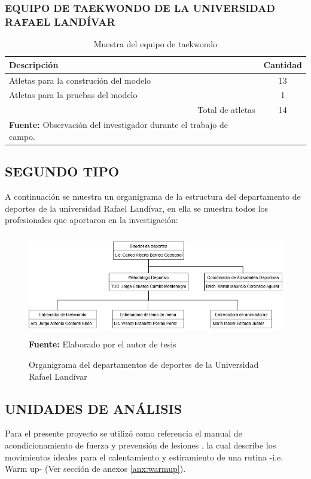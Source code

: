 \subsubsection{EQUIPO DE TAEKWONDO DE LA UNIVERSIDAD RAFAEL LAND\'IVAR}\label{sj:1t:tae}
\begin{table}[H]
\begin{center}
\caption{Muestra del equipo de taekwondo}
\label{tab:MuestraTaekwondo}
\begin{tabular}{lc}
\hline
\multicolumn{1}{|l|}{\textbf{Descripci\'on}} & \multicolumn{1}{l|}{\textbf{Cantidad}} \\ \hline
\multicolumn{1}{|l|}{Atletas para la construci\'on del modelo} & \multicolumn{1}{c|}{13} \\ \hline
\multicolumn{1}{|l|}{Atletas para la pruebas del modelo} & \multicolumn{1}{c|}{1} \\ \hline
\multicolumn{1}{|r|}{Total de atletas} & \multicolumn{1}{c|}{14} \\ \hline
\textbf{Fuente:} Observaci\'on del investigador durante el trabajo de campo.
\end{tabular}
\end{center}
\end{table}
\subsection{SEGUNDO TIPO} \label{sj:2t}
A continuaci\'on se muestra un organigrama de la estructura del departamento de deportes de la universidad Rafael Land\'ivar, en ella se muestra todos los profesionales que aportaron en la investigaci\'on:
\begin{figure}[H]
	\caption{Organigrama del departamentos de deportes de la Universidad Rafael Land\'ivar}
	\label{fig:orgDeportes}
	\centering
	\includegraphics[width=450px,height=170px]{graphics/orgDeportes.png} \\
	\textbf{Fuente:} Elaborado por el autor de tesis
\end{figure}
\subsection{UNIDADES DE AN\'ALISIS} \label{sj:ua}
Para el presente proyecto se utiliz\'o como referencia el manual de acondicionamiento de fuerza y prevensi\'on de lesiones  \cite{arbour2006strength}, la cual describe los movimientos ideales para el calentamiento  y estiramiento de una rutina -i.e. Warm up- (Ver secci\'on de anexos \ref{anx:warmup}).